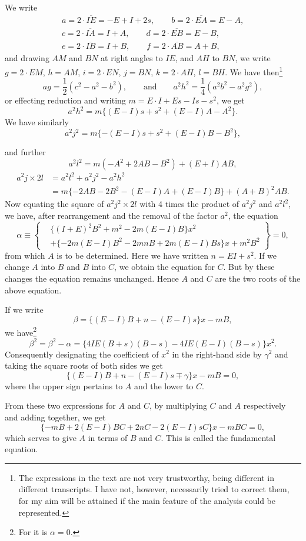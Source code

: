 \documentclass[11pt]{article}
\newcommand{\scanpage}[2]{\clearpage\setcounter{footnote}{0}\noindent{\footnotesize\color{gray}PDF page #1 · #2}\par\medskip}
\newcommand{\scanfooter}{}
\newcommand{\dd}{\mathbin{\cdot}}
\begin{document}
We write
\[
\begin{gathered}
a=2\dd\overline{IE}=-E+I+2s,\qquad b=2\dd\overline{EA}=E-A,\\
c=2\dd\overline{IA}=I+A,\qquad d=2\dd\overline{EB}=E-B,\\
e=2\dd\overline{IB}=I+B,\qquad f=2\dd\overline{AB}=A+B,
\end{gathered}
\]
and drawing $AM$ and $BN$ at right angles to $IE$, and $AH$ to $BN$, we write $g=2\dd EM$, $h=AM$, $i=2\dd EN$, $j=BN$, $k=2\dd AH$, $l=BH$. We have then\footnote{The expressions in the text are not very trustworthy, being different in different transcripts. I have not, however, necessarily tried to correct them, for my aim will be attained if the main feature of the analysis could be represented.}
\[
ag=\frac12(c^2-a^2-b^2),\qquad\text{and}\qquad a^2h^2=\frac14(a^2b^2-a^2g^2),
\]
or effecting reduction and writing $m=E\dd I+Es-Is-s^2$, we get
\[
a^2h^2=m\{(E-I)s+s^2+(E-I)A-A^2\}.
\]
We have similarly
\[
a^2j^2=m\{-(E-I)s+s^2+(E-I)B-B^2\},
\]
\scanfooter

\scanpage{0253}{Chapter 34, printed page 239}
and further
\[
a^2l^2=m(-A^2+2AB-B^2)+(E+I)AB,
\]
\[
\begin{aligned}
a^2j\times2l&=a^2l^2+a^2j^2-a^2h^2\\
&=m\{-2AB-2B^2-(E-I)A+(E-I)B\}+(A+B)^2AB.
\end{aligned}
\]
Now equating the square of $a^2j^2\times2l$ with 4 times the product of $a^2j^2$ and $a^2l^2$, we have, after rearrangement and the removal of the factor $a^2$, the equation
\[
\alpha\equiv
\left\{
\begin{aligned}
&\{(I+E)^2B^2+m^2-2m(E-I)B\}x^2\\
&+\{-2m(E-I)B^2-2mnB+2m(E-I)Bs\}x+m^2B^2
\end{aligned}
\right\}=0,
\]
from which $A$ is to be determined. Here we have written $n=EI+s^2$. If we change $A$ into $B$ and $B$ into $C$, we obtain the equation for $C$. But by these changes the equation remains unchanged. Hence $A$ and $C$ are the two roots of the above equation.

If we write
\[
\beta=\{(E-I)B+n-(E-I)s\}x-mB,
\]
we have\footnote{For it is $\alpha=0$.}
\[
\beta^2=\beta^2-\alpha=\{4IE(B+s)(B-s)-4IE(E-I)(B-s)\}x^2.
\]
Consequently designating the coefficient of $x^2$ in the right-hand side by $\gamma^2$ and taking the square roots of both sides we get
\[
\{(E-I)B+n-(E-I)s\mp\gamma\}x-mB=0,
\]
where the upper sign pertains to $A$ and the lower to $C$.

From these two expressions for $A$ and $C$, by multiplying $C$ and $A$ respectively and adding together, we get
\[
\{-mB+2(E-I)BC+2nC-2(E-I)sC\}x-mBC=0,
\]
which serves to give $A$ in terms of $B$ and $C$. This is called the fundamental equation.
\end{document}
